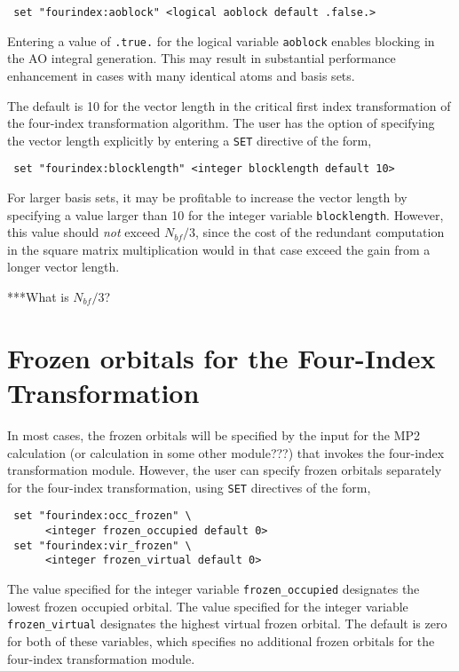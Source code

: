 \begin{verbatim}
 set "fourindex:aoblock" <logical aoblock default .false.>
\end{verbatim}

Entering a value of \verb+.true.+ for the logical variable \verb+aoblock+ 
enables blocking in the AO integral generation. This may result in 
substantial performance enhancement in cases with many identical 
atoms and basis sets.

The default is 10 for the vector length in the critical first index 
transformation of the four-index transformation algorithm.  The user has
the option of specifying the vector length explicitly by entering a 
\verb+SET+ directive of the form,

\begin{verbatim}
 set "fourindex:blocklength" <integer blocklength default 10>
\end{verbatim}


For larger basis sets, it may be profitable to increase the vector
length by specifying a value larger than 10 for the integer variable
\verb+blocklength+.  However, this value should {\em
  not} exceed $N_{bf} / 3$, since the cost of the redundant computation 
in the square matrix multiplication would in that case exceed the 
gain from a longer vector length.

\Large
***What is $N_{bf} / 3$?
\normalsize

\section{Frozen orbitals for the Four-Index Transformation}

In most cases, the frozen orbitals will be specified by the input for the 
MP2 calculation (or calculation in some other module???) that invokes the
four-index transformation module.  However, the user can specify frozen
orbitals separately for the four-index transformation, using \verb+SET+
directives of the form,

\begin{verbatim}
 set "fourindex:occ_frozen" \
      <integer frozen_occupied default 0>
 set "fourindex:vir_frozen" \
      <integer frozen_virtual default 0>
\end{verbatim}

The value specified for the integer variable \verb+frozen_occupied+ 
designates the lowest frozen occupied orbital.  The value specified
for the integer variable \verb+frozen_virtual+ designates the highest
virtual frozen orbital.  The default is zero for both of these variables,
which specifies no additional frozen orbitals for the four-index
transformation module.

